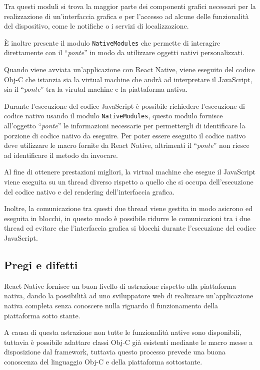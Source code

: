 Tra questi moduli si trova la maggior parte dei componenti grafici necessari per la realizzazione di un'interfaccia grafica e per l'accesso ad alcune delle funzionalità del dispositivo, come le notifiche o i servizi di localizzazione. 

\`E inoltre presente il modulo \texttt{NativeModules} che permette di interagire direttamente con il ``\textit{ponte}'' in modo da utilizzare oggetti nativi personalizzati.

Quando viene avviata un'applicazione con React Native, viene eseguito del codice Obj-C che istanzia sia la virtual machine che andrà ad interpretare il JavaScript, sia il ``\textit{ponte}'' tra la virutal machine e la piattaforma nativa.

Durante l'esecuzione del codice JavaScript è possibile richiedere l'esecuzione di codice nativo usando il modulo \texttt{NativeModules}, questo modulo fornisce all'oggetto ``\textit{ponte}'' le informazioni necessarie per permettergli di identificare la porzione di codice nativo da eseguire.
Per poter essere eseguito il codice nativo deve utilizzare le macro fornite da React Native, altrimenti il ``\textit{ponte}'' non riesce ad identificare il metodo da invocare.

Al fine di ottenere prestazioni migliori, la virtual machine che esegue il JavaScript viene eseguita su un thread diverso rispetto a quello che si occupa dell'esecuzione del codice nativo e del rendering dell'interfaccia grafica.

Inoltre, la comunicazione tra questi due thread viene gestita in modo asicrono ed eseguita in blocchi, in questo modo è possibile ridurre le comunicazioni tra i due thread ed evitare che l'interfaccia grafica si blocchi durante l'esecuzione del codice JavaScript.

\subsection{Pregi e difetti}

React Native fornisce un buon livello di astrazione rispetto alla piattaforma nativa, dando la possibilità ad uno sviluppatore web di realizzare un'applicazione nativa completa senza conoscere nulla riguardo il funzionamento della piattaforma sotto stante.

A causa di questa astrazione non tutte le funzionalità native sono disponibili, tuttavia è possibile adattare classi Obj-C già esistenti mediante le macro messe a disposizione dal framework, tuttavia questo processo prevede una buona conoscenza del linguaggio Obj-C e della piattaforma sottostante.

